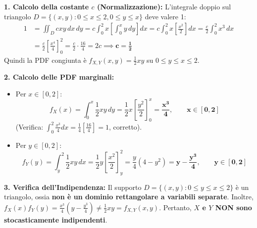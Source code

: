 \begin{dimostrazione}
\textbf{1. Calcolo della costante $c$ (Normalizzazione):}
L'integrale doppio sul triangolo $D = \{(x,y): 0 \le x \le 2, 0 \le y \le x\}$ deve valere 1:
\begin{align*}
    1 &= \iint_D c x y \, dx \, dy = c \int_0^2 x \left[ \int_0^x y \, dy \right] dx = c \int_0^2 x \left[ \frac{x^2}{2} \right] dx = \frac{c}{2} \int_0^2 x^3 \, dx \\
    &= \frac{c}{2} \left[ \frac{x^4}{4} \right]_0^2 = \frac{c}{2} \cdot \frac{16}{4} = 2 c \implies \bm{c = \frac{1}{2}}
\end{align*}
Quindi la PDF congiunta è $f_{X,Y}(x, y) = \frac{1}{2} x y$ su $0 \le y \le x \le 2$.

\textbf{2. Calcolo delle PDF marginali:}
\begin{itemize}
    \item Per $x \in [0, 2]$:
    \begin{equation*}
        f_X(x) = \int_0^x \frac{1}{2} x y \, dy = \frac{1}{2} x \left[ \frac{y^2}{2} \right]_0^x = \bm{\frac{x^3}{4}, \qquad x \in [0, 2]}
    \end{equation*}
    (Verifica: $\int_0^2 \frac{x^3}{4} dx = \frac{1}{4} [\frac{16}{4}] = 1$, corretto).
    \item Per $y \in [0, 2]$:
    \begin{equation*}
        f_Y(y) = \int_y^2 \frac{1}{2} x y \, dx = \frac{1}{2} y \left[ \frac{x^2}{2} \right]_y^2 = \frac{y}{4} (4 - y^2) = \bm{y - \frac{y^3}{4}, \qquad y \in [0, 2]}
    \end{equation*}
\end{itemize}

\textbf{3. Verifica dell'Indipendenza:}
Il supporto $D = \{(x,y): 0 \le y \le x \le 2\}$ è un triangolo, ossia \textbf{non è un dominio rettangolare a variabili separate}. Inoltre, $f_X(x) f_Y(y) = \frac{x^3}{4}(y - \frac{y^3}{4}) \neq \frac{1}{2}xy = f_{X,Y}(x,y)$.
Pertanto, \textbf{$X$ e $Y$ NON sono stocasticamente indipendenti}.


\end{dimostrazione}
